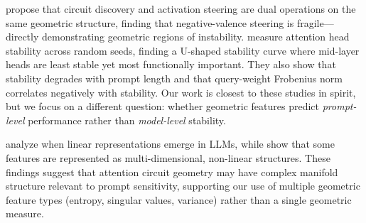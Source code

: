 \citet{suarez2026circuit} propose that circuit discovery and activation steering are dual operations on the same geometric structure, finding that negative-valence steering is fragile---directly demonstrating geometric regions of instability.
\citet{bali2026quantifying} measure attention head stability across random seeds, finding a U-shaped stability curve where mid-layer heads are least stable yet most functionally important.
They also show that stability degrades with prompt length and that query-weight Frobenius norm correlates negatively with stability.
Our work is closest to these studies in spirit, but we focus on a different question: whether geometric features predict \emph{prompt-level} performance rather than \emph{model-level} stability.

\citet{park2024linear} analyze when linear representations emerge in LLMs, while \citet{engels2024not} show that some features are represented as multi-dimensional, non-linear structures.
These findings suggest that attention circuit geometry may have complex manifold structure relevant to prompt sensitivity, supporting our use of multiple geometric feature types (entropy, singular values, variance) rather than a single geometric measure.
